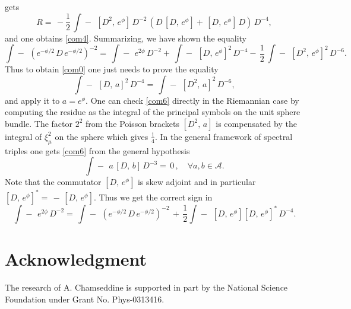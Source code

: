 \documentclass[12pt]{article}%
\begin{document}
gets
\[
R=\,-\frac{1}{2}\,\int\!\!\!\!\!\!-\ \,[D^{2},\,e^{\phi}]\,D^{-2}%
\,(D\,[D,\,e^{\phi}]+\,[D,\,e^{\phi}]\,D)\,D^{-4},
\]
and one obtains \eqref{com4}. Summarizing, we have shown the equality
\begin{equation}
\int\!\!\!\!\!\!-\ \,(e^{-\phi/2}\,D\,e^{-\phi/2})^{-2}=\,\int
\!\!\!\!\!\!-\ \,e^{2\phi}\,D^{-2}+\,\int\!\!\!\!\!\!-\ \,[D,\,e^{\phi}%
]^{2}\,D^{-4}-\,\frac{1}{2}\,\int\!\!\!\!\!\!-\ \,[D^{2},\,e^{\phi}%
]^{2}\,D^{-6}.\nonumber
\end{equation}
Thus to obtain \eqref{com0} one just needs to prove the equality
\begin{equation}
\int\!\!\!\!\!\!-\ \,[D,\,a]^{2}\,D^{-4}=\,\int\!\!\!\!\!\!-\ \,[D^{2}%
,\,a]^{2}\,D^{-6}, \label{com6}%
\end{equation}
and apply it to $a=e^{\phi}$. One can check \eqref{com6} directly in the
Riemannian case by computing the residue as the integral of the principal
symbols on the unit sphere bundle. The factor $2^{2}$ from the Poisson
brackets $[D^{2},\,a]$ is compensated by the integral of $\xi_{\mu}^{2}$ on
the sphere which gives $\frac{1}{4}$. In the general framework of spectral
triples one gets \eqref{com6} from the general hypothesis
\[
\int\!\!\!\!\!\!-\ \,a\,[D,\,b]\,D^{-3}=\,0\,,\quad\forall a,b\in\mathcal{A}.
\]
Note that the commutator $[D,\,e^{\phi}]$ is skew adjoint and in particular
$[D,\,e^{\phi}]^{\ast}=\,-\,[D,\,e^{\phi}]$. Thus we get the correct sign in
\begin{equation}
\int\!\!\!\!\!\!-\ \,e^{2\phi}\,D^{-2}=\,\int\!\!\!\!\!\!-\ \,(e^{-\phi
/2}\,D\,e^{-\phi/2})^{-2}\,+\,\frac{1}{2}\int\!\!\!\!\!\!-\ \,[D,\,e^{\phi
}][D,\,e^{\phi}]^{\ast}\,D^{-4}. \label{com10}%
\end{equation}


\section{Acknowledgment}

The research of A. Chamseddine is supported in part by the National Science
Foundation under Grant No. Phys-0313416.
\end{document}

